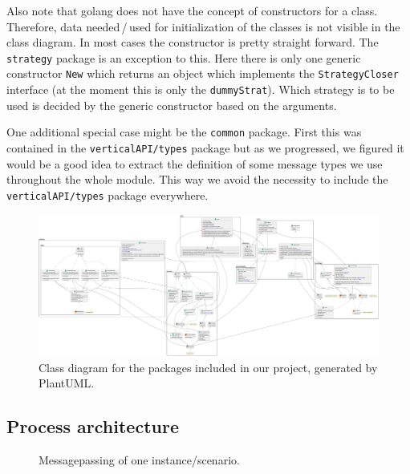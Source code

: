 \documentclass[a4paper,english,10pt,NET]{tumarticle}
\begin{document}
Also note that golang does not have the concept of constructors for a class.
Therefore, data needed\,/\,used for initialization of the classes is not visible in the class diagram.
In most cases the constructor is pretty straight forward.
The \texttt{strategy} package is an exception to this.
Here there is only one generic constructor \texttt{New} which returns an object which implements the \texttt{StrategyCloser} interface (at the moment this is only the \texttt{dummyStrat}).
Which strategy is to be used is decided by the generic constructor based on the arguments.

One additional special case might be the \texttt{common} package.
First this was contained in the \texttt{verticalAPI/types} package but as we progressed, we figured it would be a good idea to extract the definition of some message types we use throughout the whole module.
This way we avoid the necessity to include the \texttt{verticalAPI/types} package everywhere.

\begin{landscape}
	\pagestyle{empty}
	\begin{figure}
		\centering
		\hspace*{-0.1\linewidth}\includegraphics[width=1.2\linewidth]{figures/class}
		\caption{Class diagram for the packages included in our project, generated by PlantUML.}
		\label{fig:classDia}
	\end{figure}
\end{landscape}

\subsection{Process architecture} \label{sec:msgpassing}


\begin{figure}
	\centering
	
	\caption{Messagepassing of one instance/scenario.}
	\label{fig:msg}
\end{figure}
\end{document}
